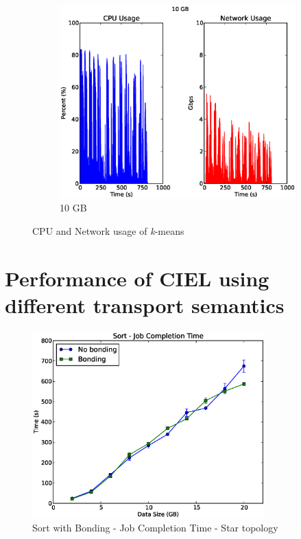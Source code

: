 \documentclass[a4paper,12pt,twoside,openright]{report}
\begin{document}
\begin{figure}[h!]
\begin{subfigure}[b]{0.33\textwidth}
                \label{fig:6GBsortres}
        \end{subfigure}
        \begin{subfigure}[b]{0.33\textwidth}
                \centering
                \includegraphics[width=\textwidth]{kmeans160.csv.eps}
                \caption{10 GB}
                \label{fig:10GBsortres}
        \end{subfigure}
        \caption{CPU and Network usage of \emph{k}-means}
        \label{chap:eval:sec:ciel:fig:kmeansres}
\end{figure}

\section{Performance of CIEL using different transport semantics}
 \begin{figure}[h!]
  \centering
    \includegraphics[width=0.8\textwidth]{sort_bonding.eps}
    \caption{Sort with Bonding - Job Completion Time - Star topology}
    \label{chap:eval:sec:ciel:fig:sortbonding}
\end{figure}
\end{document}
